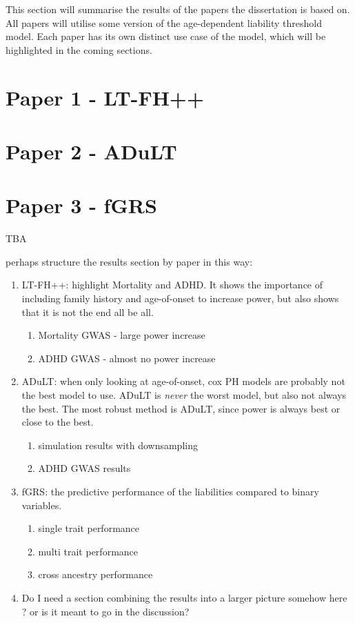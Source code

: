 


This section will summarise the results of the papers the dissertation is based on. All papers will utilise some version of the age-dependent liability threshold model. Each paper has its own distinct use case of the model, which will be highlighted in the coming sections.

\section{Paper 1 - LT-FH++}

\newpage

\section{Paper 2 - ADuLT}

\newpage

\section{Paper 3 - fGRS}
TBA
%




perhaps structure the results section by paper in this way:

\begin{enumerate}
	\item LT-FH++: highlight Mortality and ADHD. It shows the importance of including family history and age-of-onset to increase power, but also shows that it is not the end all be all.
	\begin{enumerate}
		\item Mortality GWAS - large power increase
		\item ADHD GWAS - almost no power increase
	\end{enumerate}
	\item ADuLT: when only looking at age-of-onset, cox PH models are probably not the best model to use. ADuLT is \textit{never} the worst model, but also not always the best. The most robust method is ADuLT, since power is always best or close to the best.
	\begin{enumerate}
		\item simulation results with downsampling
		\item ADHD GWAS results
	\end{enumerate}
	\item fGRS: the predictive performance of the liabilities compared to binary variables.
	\begin{enumerate}
		\item single trait performance
		\item multi trait performance 
		\item cross ancestry performance
	\end{enumerate}	
	\item Do I need a section combining the results into a larger picture somehow here ? or is it meant to go in the discussion?
\end{enumerate}
